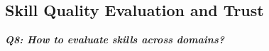 \documentclass[sigconf,nonacm]{acmart}
\begin{document}



\vspace{-7pt}
\subsection{Skill Quality Evaluation and Trust}


\hspace{\parindent}\emph{\textbf{Q8: How to evaluate skills across domains?}}
\end{document}
